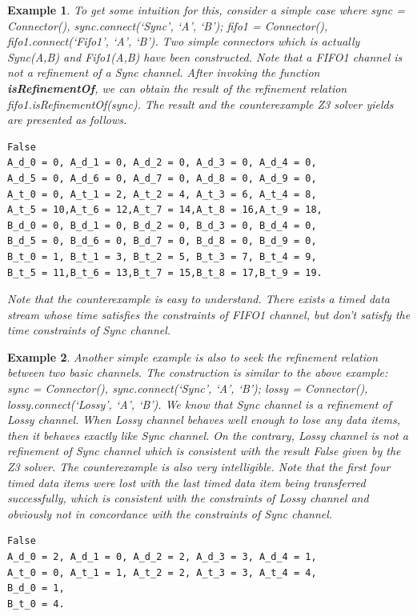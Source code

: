 \documentclass[3p,times]{elsarticle}
\newtheorem{example}{Example}[section]
\begin{document}
\begin{example}
To get some intuition for this, consider a simple case where \emph{sync = Connector(), sync.connect(`Sync', `A', `B'); fifo1 = Connector(),
fifo1.connect(`Fifo1', `A', `B')}. Two simple connectors which is actually \emph{Sync(A,B)} and \emph{Fifo1(A,B)} have been constructed. Note that a \emph{FIFO1} channel is not a refinement of a \emph{Sync} channel. After invoking the function \textbf{\emph{isRefinementOf}}, we can obtain the result of the refinement relation \emph{fifo1.isRefinementOf(sync)}. The result and the counterexample Z3 solver yields are presented as follows.
\begin{verbatim}
False
A_d_0 = 0, A_d_1 = 0, A_d_2 = 0, A_d_3 = 0, A_d_4 = 0,
A_d_5 = 0, A_d_6 = 0, A_d_7 = 0, A_d_8 = 0, A_d_9 = 0,
A_t_0 = 0, A_t_1 = 2, A_t_2 = 4, A_t_3 = 6, A_t_4 = 8, 
A_t_5 = 10,A_t_6 = 12,A_t_7 = 14,A_t_8 = 16,A_t_9 = 18,
B_d_0 = 0, B_d_1 = 0, B_d_2 = 0, B_d_3 = 0, B_d_4 = 0,
B_d_5 = 0, B_d_6 = 0, B_d_7 = 0, B_d_8 = 0, B_d_9 = 0,
B_t_0 = 1, B_t_1 = 3, B_t_2 = 5, B_t_3 = 7, B_t_4 = 9,
B_t_5 = 11,B_t_6 = 13,B_t_7 = 15,B_t_8 = 17,B_t_9 = 19.
\end{verbatim}
Note that the counterexample is easy to understand. There exists a timed data stream whose time satisfies the constraints of \emph{FIFO1} channel, but don't satisfy the time constraints of \emph{Sync} channel.
\end{example}
\begin{example}
Another simple example is also to seek the refinement relation between two basic channels. The construction is similar to the above example: \emph{sync = Connector(), sync.connect(`Sync', `A', `B'); lossy = Connector(), lossy.connect(`Lossy', `A', `B')}. We know that \emph{Sync} channel is a refinement of \emph{Lossy} channel. When \emph{Lossy} channel behaves well enough to lose any data items, then it behaves exactly like \emph{Sync} channel. On the contrary, \emph{Lossy} channel is not a refinement of \emph{Sync} channel which is consistent with the result \emph{False} given by the Z3 solver. The counterexample is also very intelligible. Note that the first four timed data items were lost with the last timed data item being transferred successfully, which is consistent with the constraints of \emph{Lossy} channel and obviously not in concordance with the constraints of \emph{Sync} channel.
\begin{verbatim}
False
A_d_0 = 2, A_d_1 = 0, A_d_2 = 2, A_d_3 = 3, A_d_4 = 1,
A_t_0 = 0, A_t_1 = 1, A_t_2 = 2, A_t_3 = 3, A_t_4 = 4,
B_d_0 = 1, 
B_t_0 = 4.
\end{verbatim}
\end{example}
\end{document}
